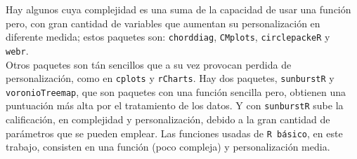 \documentclass{article}\usepackage[]{graphicx}\usepackage[]{color}
\begin{document}
Hay algunos cuya complejidad es una suma de la capacidad de usar una funci\'on pero, con gran cantidad de variables que aumentan su personalizaci\'on en diferente medida; estos paquetes son: \texttt{chorddiag}, \texttt{CMplots}, \texttt{circlepackeR} y \texttt{webr}.~\\
Otros paquetes son t\'an sencillos que a su vez provocan perdida de personalizaci\'on, como en \texttt{cplots} y \texttt{rCharts}.
Hay dos paquetes, \texttt{sunburstR} y \texttt{voronioTreemap}, que son paquetes con una funci\'on sencilla pero, obtienen una puntuaci\'on m\'as alta por el tratamiento de los datos. Y con \texttt{sunburstR} sube la calificaci\'on, en complejidad y personalizaci\'on, debido a la gran cantidad de par\'ametros que se pueden emplear.
Las funciones usadas de \texttt{R b\'asico}, en este trabajo, consisten en una funci\'on (poco compleja) y personalizaci\'on media.
\end{document}
